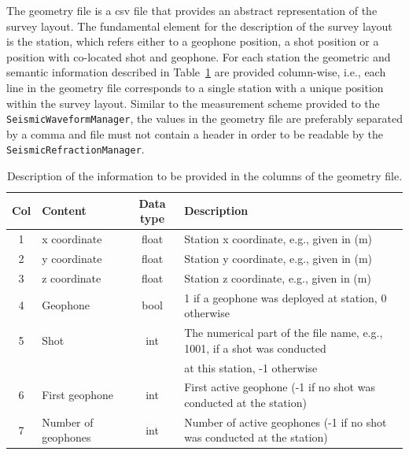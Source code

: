 \documentclass[a4paper,fleqn]{cas-sc}
\begin{document}
The geometry file is a csv file that provides an abstract representation of the survey layout. The fundamental element for the description of the survey layout is the station, which refers either to a geophone position, a shot position or a position with co-located shot and geophone. For each station the geometric and semantic information described in Table~\ref{tab:geometry} are provided column-wise, i.e., each line in the geometry file corresponds to a single station with a unique position within the survey layout. Similar to the measurement scheme provided to the \texttt{SeismicWaveformManager}, the values in the geometry file are preferably separated by a comma and file must not contain a header in order to be readable by the \texttt{SeismicRefractionManager}.
\begin{table}[pos=h]
    \caption{Description of the information to be provided in the columns of the geometry file.}
    \centering
    \begin{tabular}{clcl}
        \toprule
        Col & \textbf{Content} & \textbf{Data type} & \textbf{Description} \\
        \midrule
        1 & x coordinate & float & Station x coordinate, e.g., given in (m) \\ 
        2 & y coordinate & float & Station y coordinate, e.g., given in (m) \\ 
        3 & z coordinate & float & Station z coordinate, e.g., given in (m) \\ 
        4 & Geophone & bool & 1 if a geophone was deployed at station, 0 otherwise \\ 
        5 & Shot & int & The numerical part of the file name, e.g., 1001, if a shot was conducted \\
          & & & at this station, -1 otherwise \\ 
        6 & First geophone & int & First active geophone (-1 if no shot was conducted at the station) \\ 
        7 & Number of geophones & int & Number of active geophones (-1 if no shot was conducted at the station) \\
        \bottomrule
    \end{tabular}
    \label{tab:geometry}
\end{table}
\end{document}
